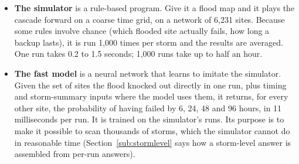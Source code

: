 \documentclass[11pt]{article}
\begin{document}
\begin{itemize}
\item \textbf{The simulator} is a rule-based program. Give it a flood map and it plays the cascade forward on a coarse time grid, on a network of 6,231 sites. Because some rules involve chance (which flooded site actually fails, how long a backup lasts), it is run 1,000 times per storm and the results are averaged. One run takes 0.2 to 1.5 seconds; 1,000 runs take up to half an hour.
\item \textbf{The fast model} is a neural network that learns to imitate the simulator. Given the set of sites the flood knocked out directly in one run, plus timing and storm-summary inputs where the model uses them, it returns, for every other site, the probability of having failed by 6, 24, 48 and 96 hours, in 11 milliseconds per run. It is trained on the simulator's runs. Its purpose is to make it possible to scan thousands of storms, which the simulator cannot do in reasonable time (Section~\ref{sub:stormlevel} says how a storm-level answer is assembled from per-run answers).
\end{itemize}

\begin{center}
\end{center}
\end{document}
